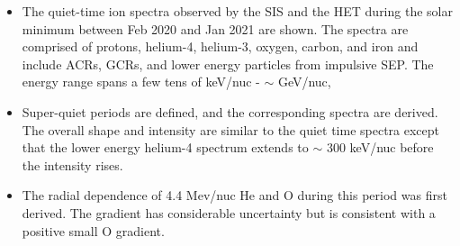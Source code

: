 \begin{itemize}
    \item The quiet-time ion spectra observed by the \ac{SIS} and the \ac{HET} during the solar minimum between Feb 2020 and Jan 2021 are shown. The spectra are comprised of protons, helium-4, helium-3, oxygen, carbon, and iron and include \acp{ACR}, \acp{GCR}, and lower energy particles from impulsive \ac{SEP}. The energy range spans a few tens of keV/nuc - $\sim$ GeV/nuc,
    \item Super-quiet periods are defined, and the corresponding spectra are derived. The overall shape and intensity are similar to the quiet time spectra except that the lower energy helium-4 spectrum extends to $\sim$ 300 keV/nuc before the intensity rises.
    \item The radial dependence of 4.4 Mev/nuc He and O during this period was first derived. The gradient has considerable uncertainty but is consistent with a positive small O gradient.
\end{itemize}


